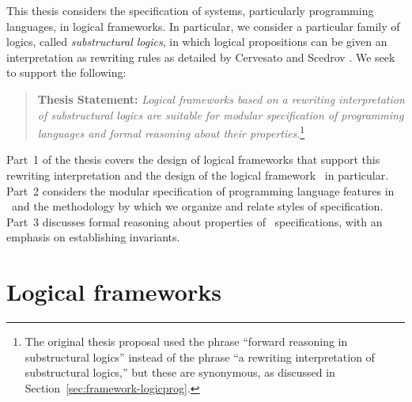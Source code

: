 This thesis considers the specification of systems, particularly
programming languages, in logical frameworks. In particular, we
consider a particular family of logics, called {\it substructural
  logics}, in which logical propositions can be given an
interpretation as rewriting rules as detailed by Cervesato and Scedrov
\cite{cervesato09relating}. %
We seek to support the
following:
\begin{quote} {\bf Thesis Statement:} {\it Logical frameworks based on
    a rewriting interpretation of substructural logics are suitable
    for modular specification of programming languages and formal
    reasoning about their properties}.\footnote{The original thesis
    proposal used the phrase ``forward reasoning in substructural
    logics'' instead of the phrase ``a rewriting interpretation of
    substructural logics,'' but these are synonymous, as discussed in
    Section~\ref{sec:framework-logicprog}.}
\end{quote}

\noindent
Part~1 of the thesis covers the design of logical frameworks 
that support this rewriting interpretation and the design of the logical
framework \sls~in particular. Part~2 considers the modular
specification of programming language features in \sls~and the
methodology by which we organize and relate styles of
specification. Part~3 discusses formal reasoning about properties of
\sls~specifications, with an emphasis on establishing invariants.

\section{Logical frameworks}

